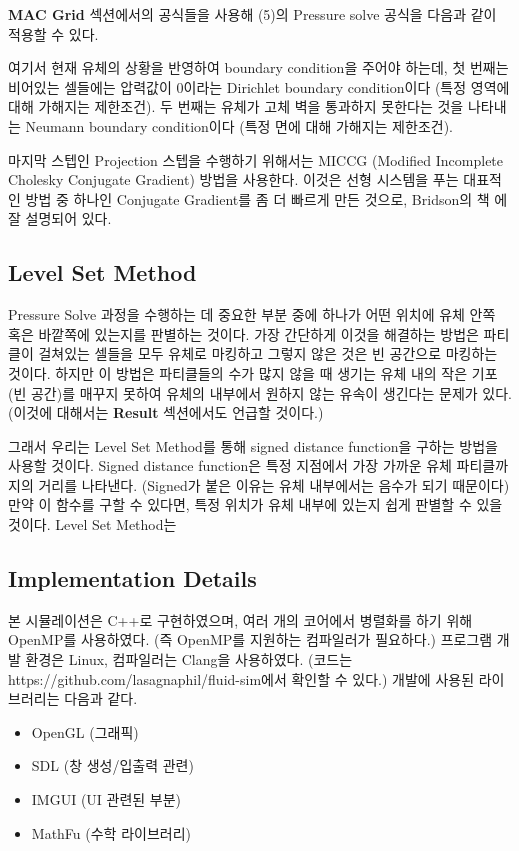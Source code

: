 \documentclass[10pt, A4]{article}
\begin{document}
\textbf{MAC Grid} 섹션에서의 공식들을 사용해 (5)의 Pressure solve 공식을 다음과 같이 적용할 수 있다.

여기서 현재 유체의 상황을 반영하여 boundary condition을 주어야 하는데, 첫 번째는 비어있는 셀들에는 압력값이 0이라는 Dirichlet boundary condition이다 (특정 영역에 대해 가해지는 제한조건). 두 번째는 유체가 고체 벽을 통과하지 못한다는 것을 나타내는 Neumann boundary condition이다 (특정 면에 대해 가해지는 제한조건).

마지막 스텝인 Projection 스텝을 수행하기 위해서는 MICCG (Modified Incomplete Cholesky Conjugate Gradient) 방법을 사용한다. 이것은 선형 시스템을 푸는 대표적인 방법 중 하나인 Conjugate Gradient를 좀 더 빠르게 만든 것으로, Bridson의 책 \cite[p.79]{fluid-sim-cg}에 잘 설명되어 있다.

\subsection{Level Set Method}

Pressure Solve 과정을 수행하는 데 중요한 부분 중에 하나가 어떤 위치에 유체 안쪽 혹은 바깥쪽에 있는지를 판별하는 것이다. 가장 간단하게 이것을 해결하는 방법은 파티클이 걸쳐있는 셀들을 모두 유체로 마킹하고 그렇지 않은 것은 빈 공간으로 마킹하는 것이다. 하지만 이 방법은 파티클들의 수가 많지 않을 때 생기는 유체 내의 작은 기포 (빈 공간)를 매꾸지 못하여 유체의 내부에서 원하지 않는 유속이 생긴다는 문제가 있다. (이것에 대해서는 \textbf{Result} 섹션에서도 언급할 것이다.) 

그래서 우리는 Level Set Method를 통해 signed distance function을 구하는 방법을 사용할 것이다. Signed distance function은 특정 지점에서 가장 가까운 유체 파티클까지의 거리를 나타낸다. (Signed가 붙은 이유는 유체 내부에서는 음수가 되기 때문이다) 만약 이 함수를 구할 수 있다면, 특정 위치가 유체 내부에 있는지 쉽게 판별할 수 있을 것이다. Level Set Method는

\subsection{Implementation Details}

본 시뮬레이션은 C++로 구현하였으며, 여러 개의 코어에서 병렬화를 하기 위해 OpenMP를 사용하였다. (즉 OpenMP를 지원하는 컴파일러가 필요하다.) 프로그램 개발 환경은 Linux, 컴파일러는 Clang을 사용하였다. (코드는 https://github.com/lasagnaphil/fluid-sim에서 확인할 수 있다.) 개발에 사용된 라이브러리는 다음과 같다.

\begin{itemize}
  \item OpenGL (그래픽)
  \item SDL (창 생성/입출력 관련)
  \item IMGUI (UI 관련된 부분)
  \item MathFu (수학 라이브러리)
\end{itemize}
\end{document}
